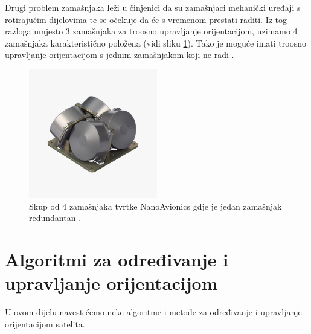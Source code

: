\documentclass[times, utf8, diplomski, numeric]{templates/template}
\begin{document}
{{{{                Drugi problem zamašnjaka leži u činjenici da su zamašnjaci mehanički uređaji s rotirajućim dijelovima te se očekuje da će s vremenom prestati raditi. Iz tog razloga umjesto 3 zamašnjaka za troosno upravljanje orijentacijom, uzimamo 4 zamašnjaka karakteristično položena (vidi sliku \ref{fig:cetiri_zamasnjaka}). Tako je moguće imati troosno upravljanje orijentacijom s jednim zamašnjakom koji ne radi \cite{cetiriZamasnjaka}.

                \begin{figure}[htb]
                \centering
                \includegraphics[width=0.5\textwidth]{images/cetiri_zamasnjaka.jpg}
                \caption{Skup od 4 zamašnjaka tvrtke NanoAvionics gdje je jedan zamašnjak redundantan \cite{cetiriZamasnjakaTvrtka}.}
                \label{fig:cetiri_zamasnjaka}
                \end{figure}
            }
        }
    }

    \section{Algoritmi za određivanje i upravljanje orijentacijom}{
        U ovom dijelu navest ćemo neke algoritme i metode za određivanje i upravljanje orijentacijom satelita. 
 
}}
\end{document}
